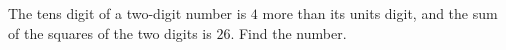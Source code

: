 The tens digit of a two-digit number is $4$ more than its units digit, and the sum of the squares of the two digits is $26$. Find the number.
